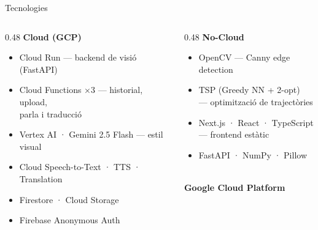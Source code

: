 \documentclass[12pt, aspectratio=169]{beamer}
\begin{document}
\begin{frame}{Tecnologies}
  \begin{columns}[T]

    \begin{column}{0.48\textwidth}
      \textbf{\color{dalblue}\faCloud\; Cloud (GCP)}
      \smallskip
      \begin{itemize}\small
        \item \alert{Cloud Run} — backend de visió (FastAPI)
        \item \alert{Cloud Functions ×3} — historial, upload,\\
              parla i traducció
        \item \alert{Vertex AI · Gemini 2.5 Flash} — estil visual
        \item Cloud Speech-to-Text · TTS · Translation
        \item Firestore · Cloud Storage
        \item Firebase Anonymous Auth
      \end{itemize}
    \end{column}

    \begin{column}{0.48\textwidth}
      \textbf{\faCog\; No-Cloud}
      \smallskip
      \begin{itemize}\small
        \item \alert{OpenCV} — Canny edge detection
        \item \alert{TSP} (Greedy NN + 2-opt)\\
              — optimització de trajectòries
        \item Next.js · React · TypeScript\\
              — frontend estàtic
        \item FastAPI · NumPy · Pillow
      \end{itemize}

      \medskip
      \begin{center}
        {\fontsize{52}{52}\selectfont\color{dalblue}\faCloud}\\[0.15cm]
        {\small\textbf{\color{dalblue}Google Cloud Platform}}
      \end{center}
    \end{column}

  \end{columns}
\end{frame}
\end{document}
